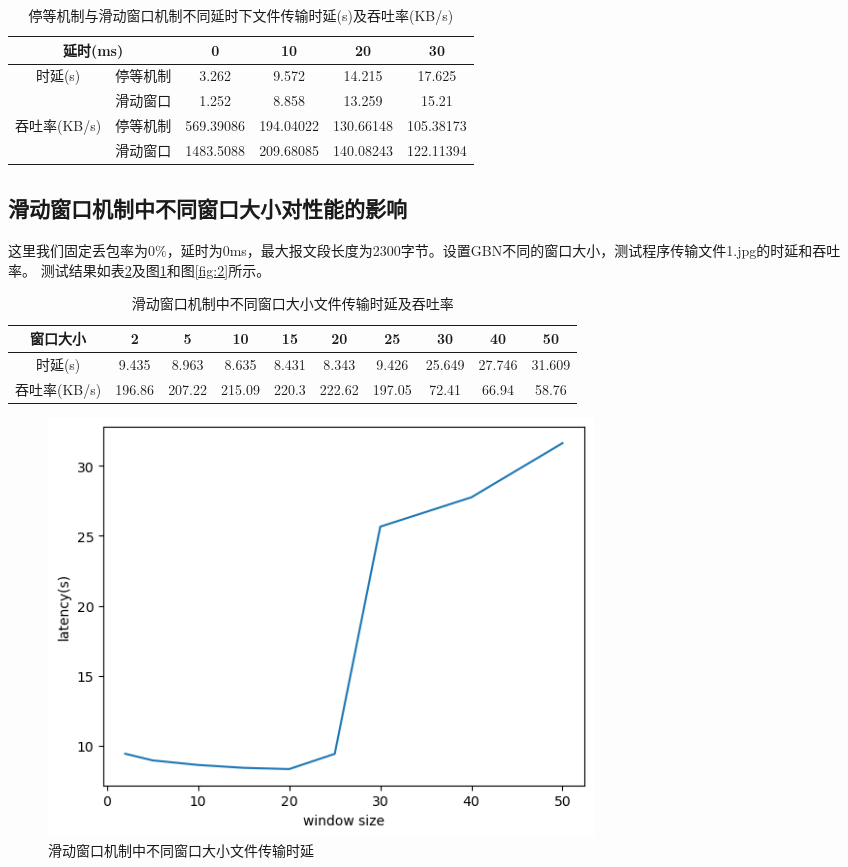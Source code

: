 \documentclass[a4paper]{article}
\begin{document}
\begin{table}[!htbp]
\centering
\begin{tabular}{|cc|c|c|c|c|}
\hline
\multicolumn{2}{|c|}{延时(ms)} & 0 & 10 & 20 & 30 \\ \hline
\multicolumn{1}{|c|}{\multirow{2}{*}{时延(s)}} & 停等机制 & 3.262 & 9.572 & 14.215 & 17.625 \\ \cline{2-6} 
\multicolumn{1}{|c|}{} & 滑动窗口 & 1.252 & 8.858 & 13.259 & 15.21 \\ \hline
\multicolumn{1}{|c|}{\multirow{2}{*}{吞吐率(KB/s)}} & 停等机制 & 569.39086 & 194.04022 & 130.66148 & 105.38173 \\ \cline{2-6} 
\multicolumn{1}{|c|}{} & 滑动窗口 & 1483.5088 & 209.68085 & 140.08243 & 122.11394 \\ \hline
\end{tabular}
\caption{停等机制与滑动窗口机制不同延时下文件传输时延(s)及吞吐率(KB/s)}
\label{table:2}
\end{table}

\subsection{滑动窗口机制中不同窗口大小对性能的影响}

这里我们固定丢包率为0\%，延时为0ms，最大报文段长度为2300字节。设置GBN不同的窗口大小，测试程序传输文件1.jpg的时延和吞吐率。
测试结果如表\ref{table:3}及图\ref{fig:1}和图\ref{fig:2}所示。

\begin{table}[!htbp]
\centering
\begin{tabular}{|c|c|c|c|c|c|c|c|c|c|}
\hline
窗口大小 & 2 & 5 & 10 & 15 & 20 & 25 & 30 & 40 & 50 \\ \hline
时延(s) & 9.435 & 8.963 & 8.635 & 8.431 & 8.343 & 9.426 & 25.649 & 27.746 & 31.609 \\ \hline
吞吐率(KB/s) & 196.86 & 207.22 & 215.09 & 220.3 & 222.62 & 197.05 & 72.41 & 66.94 & 58.76 \\ \hline
\end{tabular}
\caption{滑动窗口机制中不同窗口大小文件传输时延及吞吐率}
\label{table:3}
\end{table}

\begin{figure}[H]
  \centering
  \includegraphics[width=0.7\textwidth]{f0.jpg}
  \caption{滑动窗口机制中不同窗口大小文件传输时延}
  \label{fig:1}
\end{figure}
\end{document}
